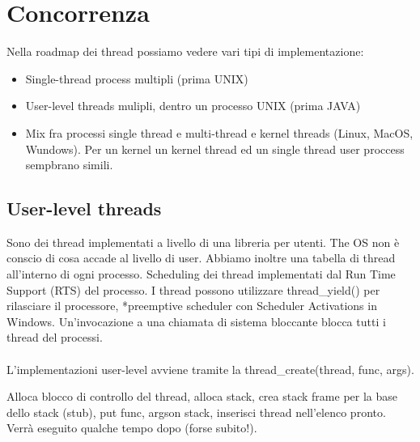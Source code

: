 \newpage
\section{Concorrenza}
Nella roadmap dei thread possiamo vedere vari tipi di implementazione:
\begin{itemize}
    \item Single-thread process multipli (prima UNIX)
    \item User-level threads mulipli, dentro un processo UNIX (prima JAVA)
    \item Mix fra processi single thread e multi-thread e kernel threads (Linux, MacOS, Wundows). Per un kernel un
    kernel thread ed un single thread user proccess sempbrano simili.
\end{itemize}

\subsection{User-level threads}
Sono dei thread implementati a livello di una libreria per utenti. The OS non è conscio di cosa accade al livello di user.
Abbiamo inoltre una tabella di thread all'interno di ogni processo. Scheduling dei thread implementati dal Run Time Support (RTS) del processo. I thread possono utilizzare thread_yield() per rilasciare il processore, *preemptive scheduler con Scheduler Activations in Windows.
Un'invocazione a una chiamata di sistema bloccante blocca tutti i thread del processi.\\\\
L'implementazioni user-level avviene tramite la thread_create(thread, func, args).

\begin{definition}
    Alloca blocco di controllo del thread, alloca stack, 
    crea stack frame per la base dello stack (stub), put func, argson stack, 
    inserisci thread nell'elenco pronto. Verrà eseguito qualche tempo dopo (forse subito!).
\end{definition}

